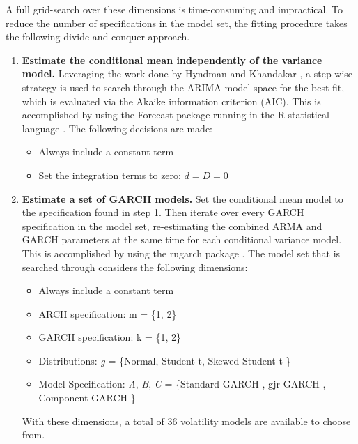 \documentclass[12pt]{article}
\begin{document}
A full grid-search over these dimensions is time-consuming and impractical. To reduce the number of specifications in the model set, the fitting procedure takes the following divide-and-conquer approach.

\begin{enumerate}
    \item \textbf{Estimate the conditional mean independently of the variance model.} Leveraging the work done by Hyndman and Khandakar \cite{HyndmanKhandakar2008AutoArima}, a step-wise strategy is used to search through the ARIMA model space for the best fit, which is evaluated via the Akaike information criterion (AIC). This is accomplished by using the Forecast package \cite{RForecast} running in the R statistical language \cite{RBase}. The following decisions are made: 
    
    \begin{itemize}
        \item Always include a constant term
        \item Set the integration terms to zero: $d = D = 0$
    \end{itemize}
    
    \item \textbf{Estimate a set of GARCH models.} Set the conditional mean model to the specification found in step 1. Then iterate over every GARCH specification in the model set, re-estimating the combined ARMA and GARCH parameters at the same time for each conditional variance model. This is accomplished by using the rugarch package \cite{Rugarch}. The model set that is searched through considers the following dimensions:
    
    \begin{itemize}
        \item Always include a constant term
        \item ARCH specification: m = \{1, 2\}
        \item GARCH specification: k = \{1, 2\}
        \item Distributions: \emph{g} = \{Normal, Student-t, Skewed Student-t \cite{FernandezSteel1998}\}
        \item Model Specification: \emph{A}, \emph{B}, \emph{C} = \{Standard GARCH \cite{Bollerslev1986Garch}, gjr-GARCH \cite{GJR1993Garch}, Component GARCH \cite{EngleLee1993APA} \}
    \end{itemize}
    
    With these dimensions, a total of 36 volatility models are available to choose from.


\end{enumerate}
\end{document}
